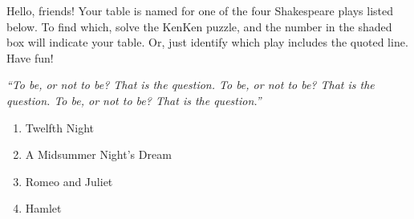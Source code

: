 \documentclass{article}
\newcounter{row}
\newcounter{col}
\edef\puzzlescale{1.2}
\edef\numrows{4}
\newcommand\setrow[\numrows]{
  \setcounter{col}{1}
  \foreach \n in {#1, #2, #3, #4} {
    \edef\x{\value{col} - 1}
    \edef\y{1 + \numrows - \value{row}}
    \node[anchor=north west,scale=0.75*\puzzlescale] at (\x, \y) {\n};
    \stepcounter{col}
  }
  \stepcounter{row}
}
\newcommand\boldh[3]{
  \edef\y{\numrows-#1}
  \edef\x{#2}
  \edef\z{\x + #3}
  \draw[very thick] (\x, \y) -- (\z, \y);
}
\newcommand\boldv[3]{
  \edef\y{\numrows-#1}
  \edef\x{#2}
  \edef\z{\y - #3}
  \draw[ultra thick] (\x, \y) -- (\x, \z);
}
\newcommand\shadebox[2]{
  \edef\y{\numrows-#1}
  \edef\x{#2}
  \fill[shadegray] (\x, \y) rectangle (\x+1,\y-1);
}
\begin{document}
    
  
  


Hello, friends! 
Your table is named for one of the four Shakespeare plays listed
below.  To find which, solve the KenKen puzzle, and the number in the
shaded box will indicate your table.  Or, just identify which
play includes the quoted line.  Have fun!

\medskip

\begin{minipage}[center]{0.58\textwidth}

  \bigskip
  
  \parbox{0.85\textwidth}{
    \it
  \noindent
    ``To be, or not to be?  That is the question.
    \phantom{``}To be, or not to be?  That is the question.
    \phantom{``}To be, or not to be?  That is the question.''
  }

  \begin{enumerate}
    \setlength{\itemsep}{1pt}
  \item Twelfth Night
  \item A Midsummer Night's Dream
  \item Romeo and Juliet
  \item Hamlet
  \end{enumerate}
\end{minipage}
%
\begin{minipage}[center]{0.38\textwidth}
\end{minipage}
%
\end{document}
